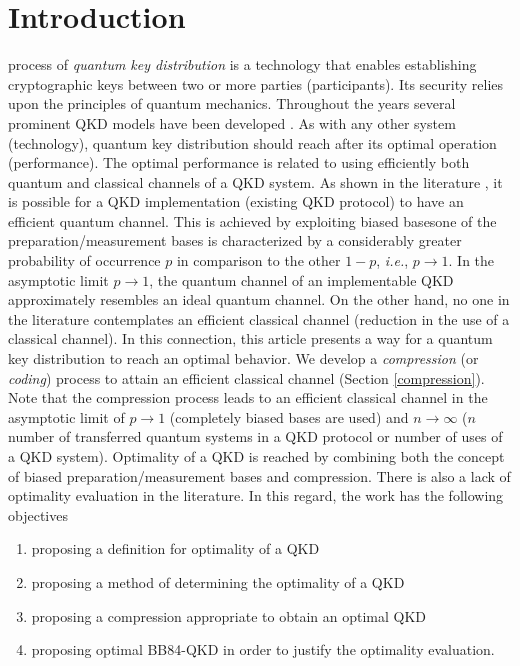 \documentclass[journal,onecolumn]{IEEEtran}
\theoremstyle{thmstyleone}%
\theoremstyle{thmstyletwo}%
\theoremstyle{thmstylethree}%
\begin{document}
	\section{Introduction}\label{sec1}
	 process of \textit{quantum key distribution} is a technology that enables establishing cryptographic keys between two or more parties (participants). Its security relies upon the principles of quantum mechanics. Throughout the years several prominent QKD models have been developed \cite{Bennett1984,Ekert1991,Lo2005,Lo2012,Lucamarini2018,Curty2019,Wang2018}. As with any other system (technology), quantum key distribution should reach after its optimal operation (performance). The optimal performance is related to using efficiently both quantum and classical channels of a QKD system. As shown in the literature \cite{Lo2005,Curty2019}, it is possible for a QKD implementation (existing QKD protocol) to have an efficient quantum channel. This is achieved by exploiting biased bases\textemdash one of the preparation/measurement bases is characterized by a considerably greater probability of occurrence $p$ in comparison to the other $\text{1}-p$, \textit{\textit{i.e.}}, $p\rightarrow\text{1}$. In the asymptotic limit $p\rightarrow\text{1}$, the quantum channel of an implementable QKD approximately resembles an ideal quantum channel. On the other hand, no one in the literature contemplates an efficient classical channel (reduction in the use of a classical channel). In this connection, this article presents a way for a quantum key distribution to reach an optimal behavior. We develop a \textit{compression} (or \textit{coding}) \cite{Huffman1952} process to attain an efficient classical channel (Section \ref{compression}). Note that the compression process leads to an efficient classical channel in the asymptotic limit of $p\rightarrow\text{1}$ (completely biased bases are used) 
	and $n\rightarrow\infty$ ($n$\textemdash number of transferred quantum systems in a QKD protocol or number of uses of a QKD system). Optimality of a QKD is reached by combining both the concept of biased preparation/measurement bases and compression. There is also a lack of optimality evaluation in the literature.
	In this regard, the work has the following objectives
	\begin{enumerate}
		\item proposing a definition for optimality of a QKD
		\item proposing a method of determining the optimality of a QKD 
		\item proposing a compression appropriate to obtain an optimal QKD
		\item proposing optimal BB84-QKD in order to justify the optimality evaluation.
	\end{enumerate}
\end{document}
